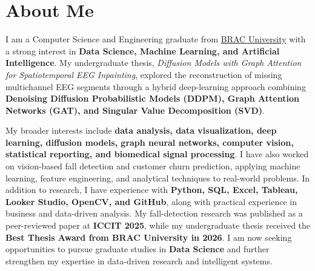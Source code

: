 \section{About Me}

I am a Computer Science and Engineering graduate from \href{https://www.bracu.ac.bd/}{BRAC University} with a strong interest in \textbf{Data Science, Machine Learning, and Artificial Intelligence}. My undergraduate thesis, \textit{Diffusion Models with Graph Attention for Spatiotemporal EEG Inpainting}, explored the reconstruction of missing multichannel EEG segments through a hybrid deep-learning approach combining \textbf{Denoising Diffusion Probabilistic Models (DDPM), Graph Attention Networks (GAT), and Singular Value Decomposition (SVD)}.

My broader interests include \textbf{data analysis, data visualization, deep learning, diffusion models, graph neural networks, computer vision, statistical reporting, and biomedical signal processing}. I have also worked on vision-based fall detection and customer churn prediction, applying machine learning, feature engineering, and analytical techniques to real-world problems. In addition to research, I have experience with \textbf{Python, SQL, Excel, Tableau, Looker Studio, OpenCV, and GitHub}, along with practical experience in business and data-driven analysis. My fall-detection research was published as a peer-reviewed paper at \textbf{ICCIT 2025}, while my undergraduate thesis received the \textbf{Best Thesis Award from BRAC University in 2026}. I am now seeking opportunities to pursue graduate studies in \textbf{Data Science} and further strengthen my expertise in data-driven research and intelligent systems.

\endinput